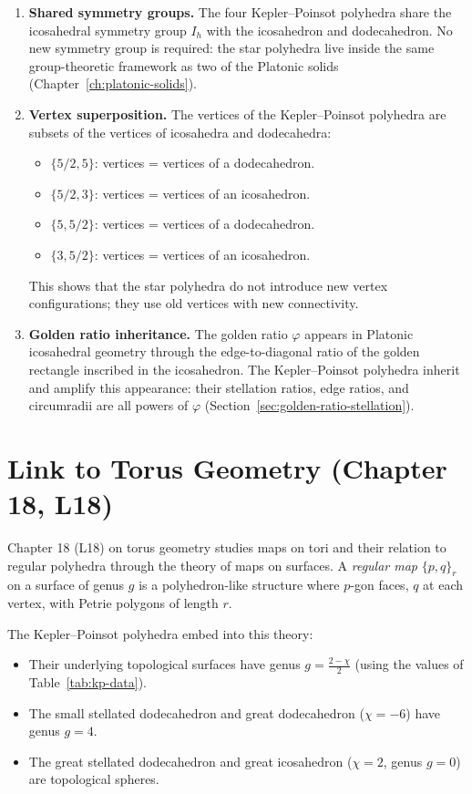 \begin{enumerate}
\item \textbf{Shared symmetry groups.}  The four Kepler–Poinsot
polyhedra share the icosahedral symmetry group $I_h$ with the
icosahedron and dodecahedron.  No new symmetry group is
required: the star polyhedra live inside the same group-theoretic
framework as two of the Platonic solids
(Chapter~\ref{ch:platonic-solids}).

\item \textbf{Vertex superposition.}  The vertices of the
Kepler–Poinsot polyhedra are subsets of the vertices of
icosahedra and dodecahedra:
  \begin{itemize}
  \item $\{5/2,5\}$: vertices = vertices of a dodecahedron.
  \item $\{5/2,3\}$: vertices = vertices of an icosahedron.
  \item $\{5,5/2\}$: vertices = vertices of a dodecahedron.
  \item $\{3,5/2\}$: vertices = vertices of an icosahedron.
  \end{itemize}
This shows that the star polyhedra do not introduce new vertex
configurations; they use old vertices with new connectivity.

\item \textbf{Golden ratio inheritance.}  The golden ratio
$\varphi$ appears in Platonic icosahedral geometry through
the edge-to-diagonal ratio of the golden rectangle inscribed in
the icosahedron.  The Kepler–Poinsot polyhedra inherit and
amplify this appearance: their stellation ratios, edge ratios,
and circumradii are all powers of $\varphi$
(Section~\ref{sec:golden-ratio-stellation}).
\end{enumerate}

\section{Link to Torus Geometry (Chapter 18, L18)}
\label{sec:link-torus}

Chapter 18 (L18) on torus geometry studies maps on tori and
their relation to regular polyhedra through the theory of maps
on surfaces.  A \emph{regular map} $\{p,q\}_r$ on a surface of
genus $g$ is a polyhedron-like structure where $p$-gon faces,
$q$ at each vertex, with Petrie polygons of length $r$.

The Kepler–Poinsot polyhedra embed into this theory:
\begin{itemize}
  \item Their underlying topological surfaces have genus
        $g = \frac{2-\chi}{2}$ (using the values of
        Table~\ref{tab:kp-data}).
  \item The small stellated dodecahedron and great dodecahedron
        ($\chi = -6$) have genus $g=4$.
  \item The great stellated dodecahedron and great icosahedron
        ($\chi = 2$, genus $g=0$) are topological spheres.
\end{itemize}

